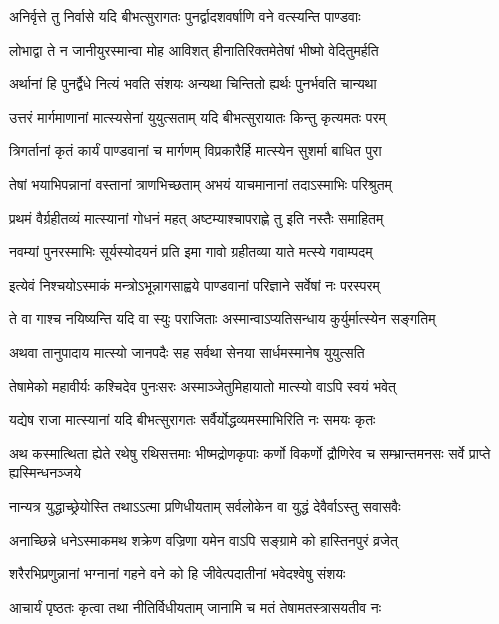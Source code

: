 \twolineshloka
{अनिर्वृत्ते तु निर्वासे यदि बीभत्सुरागतः}
{पुनर्द्वादशवर्षाणि वने वत्स्यन्ति पाण्डवाः}


\twolineshloka
{लोभाद्वा ते न जानीयुरस्मान्वा मोह आविशत्}
{हीनातिरिक्तमेतेषां भीष्मो वेदितुमर्हति}


\twolineshloka
{अर्थानां हि पुनर्द्वैधे नित्यं भवति संशयः}
{अन्यथा चिन्तितो ह्यर्थः पुनर्भवति चान्यथा}


\twolineshloka
{उत्तरं मार्गमाणानां मात्स्यसेनां युयुत्सताम्}
{यदि बीभत्सुरायातः किन्तु कृत्यमतः परम्}


\twolineshloka
{त्रिगर्तानां कृतं कार्यं पाण्डवानां च मार्गणम्}
{विप्रकारैर्हि मात्स्येन सुशर्मा बाधित पुरा}


\twolineshloka
{तेषां भयाभिपन्नानां वस्तानां त्राणभिच्छताम्}
{अभयं याचमानानां तदाऽस्माभिः परिश्रुतम्}


\twolineshloka
{प्रथमं वैर्ग्रहीतव्यं मात्स्यानां गोधनं महत्}
{अष्टम्याश्चापराह्णे तु इति नस्तैः समाहितम्}


\twolineshloka
{नवम्यां पुनरस्माभिः सूर्यस्योदयनं प्रति}
{इमा गावो ग्रहीतव्या याते मत्स्ये गवाम्पदम्}


\twolineshloka
{इत्येवं निश्चयोऽस्माकं मन्त्रोऽभून्नागसाह्वये}
{पाण्डवानां परिज्ञाने सर्वेषां नः परस्परम्}


\twolineshloka
{ते वा गाश्च नयिष्यन्ति यदि वा स्युः पराजिताः}
{अस्मान्वाऽप्यतिसन्धाय कुर्युर्मात्स्येन सङ्गतिम्}


\twolineshloka
{अथवा तानुपादाय मात्स्यो जानपदैः सह}
{सर्वथा सेनया सार्धमस्मानेष युयुत्सति}


\twolineshloka
{तेषामेको महावीर्यः कश्चिदेव पुनःसरः}
{अस्माञ्जेतुमिहायातो मात्स्यो वाऽपि स्वयं भवेत्}


\twolineshloka
{यद्येष राजा मात्स्यानां यदि बीभत्सुरागतः}
{सर्वैर्योद्धव्यमस्माभिरिति नः समयः कृतः}


\threelineshloka
{अथ कस्मात्थिता ह्येते रथेषु रथिसत्तमाः}
{भीष्मद्रोणकृपाः कर्णो विकर्णो द्रौणिरेव च}
{सम्भ्रान्तमनसः सर्वे प्राप्ते ह्यस्मिन्धनञ्जये}


\twolineshloka
{नान्यत्र युद्धाच्छ्रेयोस्ति तथाऽऽत्मा प्रणिधीयताम्}
{सर्वलोकेन वा युद्धं देवैर्वाऽस्तु सवासवैः}


\twolineshloka
{अनाच्छिन्ने धनेऽस्माकमथ शक्रेण वज्रिणा}
{यमेन वाऽपि सङ्ग्रामे को हास्तिनपुरं व्रजेत्}


\twolineshloka
{शरैरभिप्रणुन्नानां भग्नानां गहने वने}
{को हि जीवेत्पदातीनां भवेदश्वेषु संशयः}


\twolineshloka
{आचार्यं पृष्ठतः कृत्वा तथा नीतिर्विधीयताम्}
{जानामि च मतं तेषामतस्त्रासयतीव नः}


